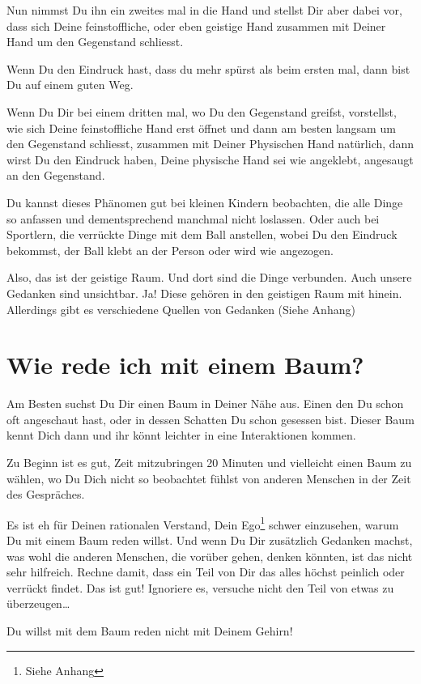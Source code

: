 \documentclass[11pt,titlepage,a5paper]{book}
\begin{document}
Nun nimmst Du ihn ein zweites mal in die Hand und stellst Dir aber dabei vor, dass sich Deine feinstoffliche, oder eben geistige Hand zusammen mit Deiner Hand um den Gegenstand schliesst. 

Wenn Du den Eindruck hast, dass du mehr spürst als beim ersten mal, dann bist Du auf einem guten Weg. 

Wenn Du Dir bei einem dritten mal, wo Du den Gegenstand  greifst, vorstellst, wie sich Deine feinstoffliche Hand erst öffnet und dann am besten langsam um den Gegenstand schliesst, zusammen mit Deiner Physischen Hand natürlich, dann wirst Du den Eindruck haben, Deine physische Hand sei wie angeklebt, angesaugt an den Gegenstand.

Du kannst dieses Phänomen gut bei kleinen Kindern beobachten, die alle Dinge so  anfassen und dementsprechend manchmal nicht loslassen. Oder auch bei Sportlern, die verrückte Dinge mit dem Ball anstellen, wobei Du den Eindruck bekommst, der Ball klebt an der Person oder wird wie angezogen.

Also, das ist der geistige Raum. Und dort sind die Dinge verbunden. Auch unsere Gedanken sind unsichtbar. Ja! Diese gehören in den geistigen Raum mit hinein. Allerdings gibt es verschiedene Quellen von Gedanken (Siehe Anhang)

\section{Wie rede ich mit einem Baum?}

Am Besten suchst Du Dir einen Baum in Deiner Nähe aus. Einen den Du schon oft angeschaut hast, oder in dessen Schatten Du schon gesessen bist. Dieser Baum kennt Dich dann und ihr könnt leichter in eine Interaktionen kommen.

Zu Beginn ist es gut, Zeit mitzubringen 20 Minuten und vielleicht einen Baum zu wählen, wo Du Dich nicht so beobachtet fühlst von anderen Menschen in der Zeit des Gespräches.

Es ist eh für Deinen rationalen Verstand, Dein Ego\footnote{Siehe Anhang} schwer einzusehen, warum Du mit einem Baum reden willst. Und wenn Du Dir zusätzlich Gedanken machst, was wohl die anderen Menschen, die vorüber gehen, denken könnten, ist das nicht sehr hilfreich. Rechne damit, dass ein Teil von Dir das alles höchst peinlich oder verrückt findet. Das ist gut! Ignoriere es, versuche nicht den Teil von etwas zu überzeugen\dots

Du willst mit dem Baum reden nicht mit Deinem Gehirn!
\end{document}
